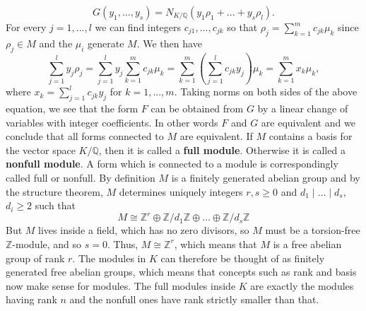 \documentclass{article}
\newcommand{\mbb}[1]{\mathbb{#1}}
\begin{document}
$$G(y_1, ..., y_s) = N_{K/\mbb Q}(y_1 \rho_1 + ... + y_s \rho_l).$$
For every $j = 1, ..., l$ we can find integers $c_{j1}, ..., c_{jk}$ so that
$\rho_j = \sum_{k=1}^m c_{jk} \mu_k$ since $\rho_j \in M$ and the $\mu_i$ generate $M$. We then have
$$\sum_{j=1}^l y_j \rho_j = \sum_{j=1}^l y_j \sum_{k=1}^m c_{jk} \mu_k = \sum_{k=1}^m (\sum_{j=1}^l c_{jk} y_j) \mu_k = \sum_{k=1}^m x_k \mu_k,$$
where $x_k = \sum_{j=1}^l c_{jk} y_j$ for $k = 1, ..., m$. Taking norms on both sides of the above equation, we see that the form $F$ can be obtained from $G$ by a linear change of variables with integer coefficients. In other words $F$ and $G$ are equivalent and we conclude that all forms connected to $M$ are equivalent. If $M$ contains a basis for the vector space $K / \mbb{Q}$, then it is called a \textbf{full module}. Otherwise it is called a \textbf{nonfull module}. A form which is connected to a module is correspondingly called full or nonfull. By definition $M$ is a finitely generated abelian group and by the structure theorem, $M$ determines uniquely integers $r,s \geq 0$ and $d_1 \mid ... \mid d_s$, $d_i \geq 2$ such that
$$M \cong \mbb{Z}^r \oplus \mbb{Z}/d_1\mbb{Z} \oplus ... \oplus \mbb{Z}/d_s\mbb{Z} $$
But $M$ lives inside a field, which has no zero divisors, so $M$ must be a torsion-free $\mbb{Z}$-module, and so $s = 0$. Thus, $M \cong \mbb{Z}^r$, which means that $M$ is a free abelian group of rank $r$. The modules in $K$ can therefore be thought of as finitely generated free abelian groups, which means that concepts such as rank and basis now make sense for modules. The full modules inside $K$ are exactly the modules having rank $n$ and the nonfull ones have rank strictly smaller than that. 
\end{document}
